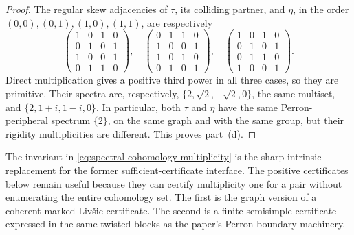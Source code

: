 \begin{proof}
  The regular skew adjacencies of \(\tau\), its colliding partner, and
  \(\eta\), in the order \((0,0),(0,1),(1,0),(1,1)\), are respectively
  \[
    \begin{pmatrix}1&0&1&0\\0&1&0&1\\1&0&0&1\\0&1&1&0\end{pmatrix},
    \quad
    \begin{pmatrix}0&1&1&0\\1&0&0&1\\1&0&1&0\\0&1&0&1\end{pmatrix},
    \quad
    \begin{pmatrix}1&0&1&0\\0&1&0&1\\0&1&1&0\\1&0&0&1\end{pmatrix}.
  \]
  Direct multiplication gives a positive third power in all three cases,
  so they are primitive.  Their spectra are, respectively,
  \(\{2,\sqrt2,-\sqrt2,0\}\), the same multiset, and
  \(\{2,1+i,1-i,0\}\).  In particular, both \(\tau\) and \(\eta\) have
  the same Perron-peripheral spectrum \(\{2\}\), on the same graph and with
  the same group, but their rigidity multiplicities are different.  This
  proves part~(d).
\end{proof}

The invariant in \eqref{eq:spectral-cohomology-multiplicity} is the sharp
intrinsic replacement for the former sufficient-certificate interface.  The
positive certificates below remain useful because they can certify
multiplicity one for a pair without enumerating the entire cohomology set.
The first is the graph version of a coherent marked Liv\v{s}ic certificate.
The second is a finite semisimple certificate expressed in the same twisted
blocks as the paper's Perron-boundary machinery.

